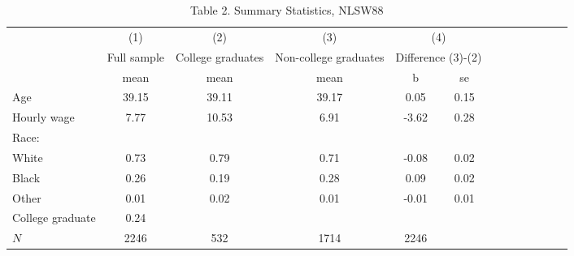 \begin{table}[htbp]\centering
\def\sym#1{\ifmmode^{#1}\else\(^{#1}\)\fi}
\caption{Table 2. Summary Statistics, NLSW88}
\begin{tabular}{l*{4}{ccc}}
\hline\hline
          &\multicolumn{1}{c}{(1)}&\multicolumn{1}{c}{(2)}&\multicolumn{1}{c}{(3)}&\multicolumn{2}{c}{(4)}\\
          &\multicolumn{1}{c}{Full sample}&\multicolumn{1}{c}{College graduates}&\multicolumn{1}{c}{Non-college graduates}&\multicolumn{2}{c}{Difference (3)-(2)}\\
          &     mean&     mean&     mean&        b&       se\\
\hline
Age       &    39.15&    39.11&    39.17&     0.05&     0.15\\
Hourly wage&     7.77&    10.53&     6.91&    -3.62&     0.28\\
Race:     &         &         &         &         &         \\
White     &     0.73&     0.79&     0.71&    -0.08&     0.02\\
Black     &     0.26&     0.19&     0.28&     0.09&     0.02\\
Other     &     0.01&     0.02&     0.01&    -0.01&     0.01\\
College graduate&     0.24&         &         &         &         \\
\hline
\(N\)     &     2246&      532&     1714&     2246&         \\
\hline\hline
\end{tabular}
\end{table}
